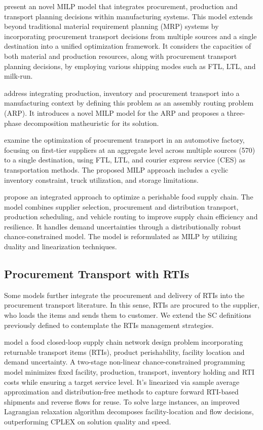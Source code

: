 \autocite{Diaz-Madronero2017ADecisions} present an novel MILP model that integrates  procurement, production and transport planning decisions within manufacturing systems. This model extends beyond traditional material requirement planning (MRP) systems by incorporating procurement transport decisions from multiple sources and a single destination into a unified optimization framework. It considers the capacities of both material and production resources, along with procurement transport planning decisions, by employing various shipping modes such as FTL, LTL, and milk-run.

\autocite{Chitsaz2019ARouting} address integrating production, inventory and procurement transport into a manufacturing context by defining this problem as an assembly routing problem (ARP). It introduces a novel MILP model for the ARP and proposes a three-phase decomposition matheuristic for its solution.

\autocite{Baller2022OptimizingApproach} examine the optimization of procurement transport in an automotive factory, focusing on first-tier suppliers at an aggregate level across multiple sources (570) to a single destination, using FTL, LTL, and courier express service (CES) as transportation methods. The proposed MILP approach includes a cyclic inventory constraint, truck utilization, and storage limitations.

\autocite{Hashemi-Amiri2023IntegratedApproach} propose an integrated approach to optimize a perishable food supply chain. The model combines supplier selection, procurement and distribution transport, production scheduling, and vehicle routing to improve supply chain efficiency and resilience. It handles demand uncertainties through a distributionally robust chance-constrained model. The model is reformulated as MILP by utilizing duality and linearization techniques.


\subsection{Procurement Transport with RTIs}
Some models further integrate the procurement and delivery of RTIs into the procurement transport literature. In this sense, RTIs are procured to the supplier, who loads the items and sends them to customer. We extend the SC definitions previously defined to contemplate the RTIs management strategies.

model a food closed-loop supply chain network design problem incorporating returnable transport items (RTIs), product perishability, facility location and demand uncertainty. A two-stage non-linear chance-constrained programming model minimizes fixed facility, production, transport, inventory holding and RTI costs while ensuring a target service level. It’s linearized via sample average approximation and distribution-free methods to capture forward RTI-based shipments and reverse flows for reuse. To solve large instances, an improved Lagrangian relaxation algorithm decomposes facility-location and flow decisions, outperforming CPLEX on solution quality and speed.


